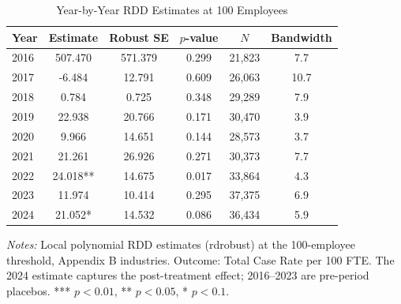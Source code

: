 \begin{table}[htbp]
\centering
\caption{Year-by-Year RDD Estimates at 100 Employees}
\label{tab:event_study}
\begin{tabular}{lccccc}
\toprule
Year & Estimate & Robust SE & $p$-value & $N$ & Bandwidth \\
\midrule
2016 & 507.470 & 571.379 & 0.299 & 21,823 & 7.7 \\
2017 & -6.484 & 12.791 & 0.609 & 26,063 & 10.7 \\
2018 & 0.784 & 0.725 & 0.348 & 29,289 & 7.9 \\
2019 & 22.938 & 20.766 & 0.171 & 30,470 & 3.9 \\
2020 & 9.966 & 14.651 & 0.144 & 28,573 & 3.7 \\
2021 & 21.261 & 26.926 & 0.271 & 30,373 & 7.7 \\
2022 & 24.018** & 14.675 & 0.017 & 33,864 & 4.3 \\
2023 & 11.974 & 10.414 & 0.295 & 37,375 & 6.9 \\
2024 & 21.052* & 14.532 & 0.086 & 36,434 & 5.9 \\
\bottomrule
\end{tabular}
\par\vspace{0.5em}\begin{flushleft}\footnotesize
\textit{Notes:} Local polynomial RDD estimates (rdrobust) at the 100-employee threshold, Appendix B industries. Outcome: Total Case Rate per 100 FTE. The 2024 estimate captures the post-treatment effect; 2016--2023 are pre-period placebos. *** $p<0.01$, ** $p<0.05$, * $p<0.1$.
\end{flushleft}
\end{table}

